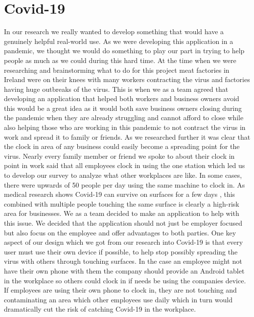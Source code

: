 \section{Covid-19}
In our research we really wanted to develop something that would have a genuinely helpful real-world use. As we were developing this application in a pandemic, we thought we would do something to play our part in trying to help people as much as we could during this hard time. At the time when we were researching and brainstorming what to do for this project meat factories in Ireland were on their knees \cite{meatPlants} with many workers contracting the virus and factories having huge outbreaks of the virus. This is when we as a team agreed that developing an application that helped both workers and business owners avoid this would be a great idea as it would both save business owners closing during the pandemic when they are already struggling and cannot afford to close while also helping those who are working in this pandemic to not contract the virus in work and spread it to family or friends.
As we researched further it was clear that the clock in area of any business could easily become a spreading point for the virus. Nearly every family member or friend we spoke to about their clock in point in work said that all employees clock in using the one station which led us to develop our survey to analyze what other workplaces are like. In some cases, there were upwards of 50 people per day using the same machine to clock in. As medical research shows Covid-19 can survive on surfaces for a few days \cite{CovidSurvives}, this combined with multiple people touching the same surface is clearly a high-risk area for businesses. We as a team decided to make an application to help with this issue. We decided that the application should not just be employer focused but also focus on the employee and offer advantages to both parties.
One key aspect of our design which we got from our research into Covid-19 is that every user must use their own device if possible, to help stop possibly spreading the virus with others through touching surfaces. In the case an employee might not have their own phone with them the company should provide an Android tablet in the workplace so others could clock in if needs be using the companies device. If employees are using their own phone to clock in, they are not touching and contaminating an area which other employees use daily which in turn would dramatically cut the risk of catching Covid-19 in the workplace.
\\
